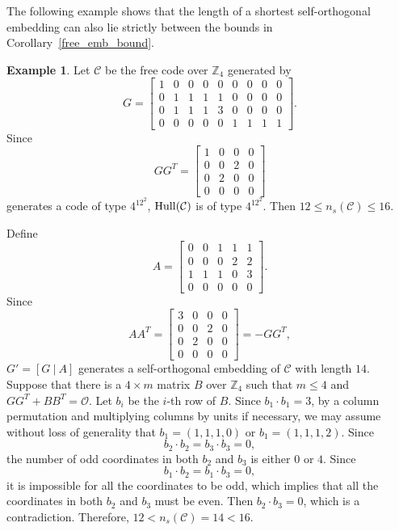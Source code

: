 \documentclass{article}
\theoremstyle{definition}
\newtheorem{example}{Example}[section]
\theoremstyle{remark}
\begin{document}
The following example shows
that the length of a shortest self-orthogonal embedding can also lie strictly between the bounds in Corollary~\ref{free_emb_bound}.

\begin{example}
    Let $\mathcal{C}$ be the free code over $\mathbb{Z}_4$ generated by
    \[
    G=\begin{bmatrix}
        1 & 0 & 0 & 0 & 0 & 0 & 0 & 0 & 0\\0 & 1 & 1 & 1 & 1 & 0 & 0 & 0 & 0\\0 & 1 & 1 & 1 & 3 & 0 & 0 & 0 & 0\\0 & 0 & 0 & 0 & 0 & 1 & 1 & 1 & 1
    \end{bmatrix}.
    \]
    Since
    \[
    GG^T=\begin{bmatrix}
        1 & 0 & 0 & 0\\0 & 0 & 2 & 0\\0 & 2 & 0 & 0\\0 & 0 & 0 & 0
    \end{bmatrix}
    \]
    generates a code of type $4^12^2$, ${\rm Hull}(\mathcal{C})$ is of type $4^12^2$. Then $12\le n_s(\mathcal{C})\le 16$.

    Define
    \[
    A=\begin{bmatrix}
        0 & 0 & 1 & 1 & 1\\0 & 0 & 0 & 2 & 2\\1 & 1 & 1 & 0 & 3\\0 & 0 & 0 & 0 & 0
    \end{bmatrix}.
    \]
    Since
    \[
    AA^T=\begin{bmatrix}
        3 & 0 & 0 & 0\\0 & 0 & 2 & 0\\0 & 2 & 0 & 0\\0 & 0 & 0 & 0
    \end{bmatrix}=-GG^T,
    \]
    $G'=[G~|~A]$ generates a self-orthogonal embedding of $\mathcal{C}$ with length $14$. Suppose that there is a $4\times m$ matrix $B$ over $\mathbb{Z}_4$ such that $m\le 4$ and $GG^T+BB^T=\mathcal{O}$. Let $b_i$ be the $i$-th row of $B$. Since $b_1\cdot b_1=3$, by a column permutation and multiplying columns by units if necessary, we may assume without loss of generality that $b_1=(1,1,1,0)$ or $b_1=(1,1,1,2)$. Since
    \[
    b_2\cdot b_2=b_3\cdot b_3=0,
    \]
    the number of odd coordinates in both $b_2$ and $b_3$ is either $0$ or $4$. Since
    \[
    b_1\cdot b_2=b_1\cdot b_3=0,
    \]
    it is impossible for all the coordinates to be odd, which implies that all the coordinates in both $b_2$ and $b_3$ must be even. Then $b_2\cdot b_3=0$, which is a contradiction. Therefore, $12 < n_s(\mathcal{C})=14 < 16$.
\end{example}
\end{document}
